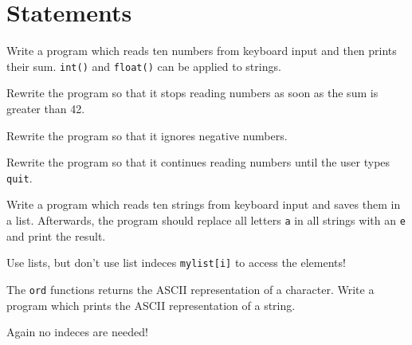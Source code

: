 \section*{Statements}
\begin{aufgabe}
Write a program which reads ten numbers from keyboard input and then prints their sum.
\hinweis \lstinline{int()} and \lstinline{float()} can be applied to strings.
\begin{teilaufgabe}
Rewrite the program so that it stops reading numbers as soon as the sum is greater than 42.
\end{teilaufgabe}
\begin{teilaufgabe}
Rewrite the program so that it ignores negative numbers.
\end{teilaufgabe}
\begin{teilaufgabe}
Rewrite the program so that it continues reading numbers until the user types \texttt{quit}.
\end{teilaufgabe}
\end{aufgabe}

\begin{aufgabe}
Write a program which reads ten strings from keyboard input and saves them in a list. Afterwards, the program should replace all letters \texttt{a} in all strings with an \texttt{e} and print the result.

\hinweis Use lists, but don't use list indeces \lstinline{mylist[i]} to access the elements!
\end{aufgabe}

\begin{aufgabe}
The \lstinline{ord} functions returns the ASCII representation of a character. Write a program which prints the ASCII representation of a string.

\hinweis Again no indeces are needed!
\end{aufgabe}


